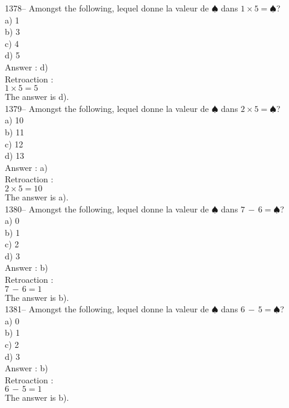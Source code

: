 ﻿\documentclass[letterpaper, 12pt]{article}
\begin{document}
1378-- Amongst the following, lequel donne la valeur de
$\spadesuit$ dans $1\times5=\spadesuit$?\\
a) 1\\
b) 3\\
c) 4\\
d) 5\\

Answer : d)\\

Retroaction : \\
$1\times5=5$\\
The answer is d).\\

1379-- Amongst the following, lequel donne la valeur de
$\spadesuit$ dans $2\times5=\spadesuit$?\\
a) 10\\
b) 11\\
c) 12\\
d) 13\\

Answer : a)\\

Retroaction : \\
$2\times5=10$\\
The answer is a).\\

1380-- Amongst the following, lequel donne la valeur de
$\spadesuit$ dans $7\,-\,6=\spadesuit$?\\
a) 0\\
b) 1\\
c) 2\\
d) 3\\

Answer : b)\\

Retroaction : \\
$7\,-\,6=1$\\
The answer is b).\\

1381-- Amongst the following, lequel donne la valeur de
$\spadesuit$ dans $6\,-\,5=\spadesuit$?\\
a) 0\\
b) 1\\
c) 2\\
d) 3\\

Answer : b)\\

Retroaction : \\
$6\,-\,5=1$\\
The answer is b).\\
\end{document}
